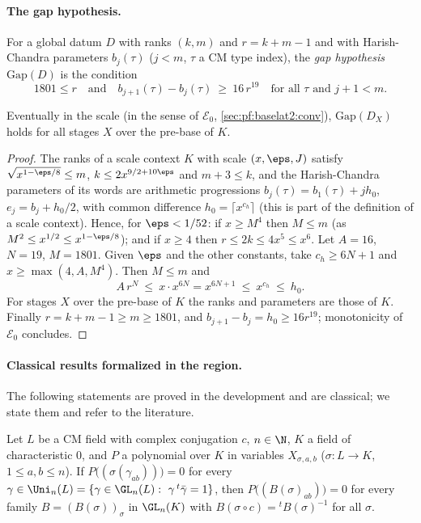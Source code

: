\paragraph{The gap hypothesis.} For a global datum $D$ with ranks $(k,m)$ and $r=k+m-1$ and with Harish-Chandra
parameters $b_j(\tau)$ ($j<m$, $\tau$ a CM type index), the \emph{gap hypothesis} $\mathrm{Gap}(D)$ is the condition
\[
  1801\le r\quad\text{and}\quad b_{j+1}(\tau)-b_j(\tau)\ \ge\ 16\,r^{19}\quad\text{for all }\tau\text{ and }j+1<m .
\]

\begin{lemma}\label{pf:baselat2:gap}
Eventually in the scale (in the sense of $\mathcal{E}_0$, \cref{sec:pf:baselat2:conv}), $\mathrm{Gap}(D_X)$ holds
for all stages $X$ over the pre-base of $K$.
\end{lemma}

\begin{proof}
The ranks of a scale context $K$ with scale $(x,\eps,J)$ satisfy $\sqrt{x^{1-\eps/8}}\le m$, $k\le2x^{9/2+10\eps}$ and $m+3\le k$,
and the Harish-Chandra parameters of its words are arithmetic progressions $b_j(\tau)=b_1(\tau)+jh_0$, $e_j=b_j+h_0/2$,
with common difference $h_0=\lceil x^{c_h}\rceil$ (this is part of the definition of a scale context). Hence, for $\eps<1/52$:
if $x\ge M^4$ then $M\le m$ (as $M^2\le x^{1/2}\le x^{1-\eps/8}$); and if $x\ge4$ then $r\le2k\le4x^5\le x^6$. Let $A=16$,
$N=19$, $M=1801$. Given $\eps$ and the other constants, take $c_h\ge6N+1$ and $x\ge\max(4,A,M^4)$. Then $M\le m$ and
\[
  A\,r^N\ \le\ x\cdot x^{6N}=x^{6N+1}\ \le\ x^{c_h}\ \le\ h_0 .
\]
For stages $X$ over the pre-base of $K$ the ranks and parameters are those of $K$. Finally
$r=k+m-1\ge m\ge1801$, and $b_{j+1}-b_j=h_0\ge16r^{19}$; monotonicity of
$\mathcal{E}_0$ concludes.
\end{proof}

\paragraph{Classical results formalized in the region.} The following statements are proved in the
development and are classical; we state them and refer to the literature.

\begin{proposition}\label{pf:baselat2:zariski}
Let $L$ be a CM field with complex conjugation $c$, $n\in\N$, $K$ a field of characteristic $0$, and $P$ a polynomial
over $K$ in variables $X_{\sigma,a,b}$ ($\sigma:L\to K$, $1\le a,b\le n$). If $P\bigl((\sigma(\gamma_{ab}))\bigr)=0$ for every
$\gamma\in\Uni_n(L)=\{\gamma\in\GL_n(L):\ \gamma\,{}^t\bar\gamma=1\}$, then $P\bigl((B(\sigma)_{ab})\bigr)=0$ for every family
$B=(B(\sigma))_{\sigma}$ in $\GL_n(K)$ with $B(\sigma\circ c)={}^tB(\sigma)^{-1}$ for all $\sigma$.
\end{proposition}

